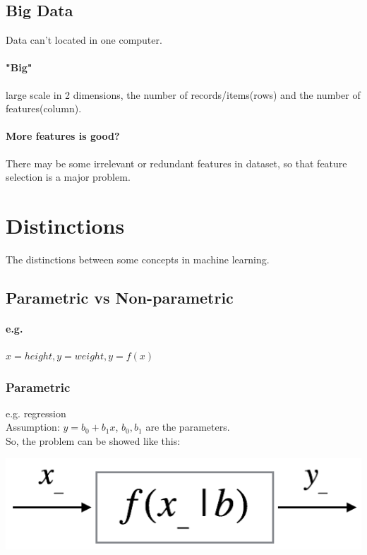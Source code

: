 \documentclass{article}
\begin{document}
{{    \subsection{Big Data}{
        Data can't located in one computer.
        \paragraph{"Big"}{
            large scale in 2 dimensions, the number of records/items(rows) and the number of features(column).
        }
        \paragraph{More features is good?}{
            There may be some irrelevant or redundant features in dataset, so that feature selection is a major problem.
        }
    }   
}
\section{Distinctions}{
    The distinctions between some concepts in machine learning.
    \subsection{Parametric vs Non-parametric}{
        \paragraph{e.g.}{
            \(x = height, y = weight, y = f(x)\)
        }
        \subsubsection{Parametric}{
            e.g. regression\\
            Assumption: $y = b_0 + b_1 x$, $b_0, b_1$ are the parameters.\\
            So, the problem can be showed like this:

            \begin{center}{
                \includegraphics[scale=0.5]{f(x_|b).png}
            }
            \end{center}

}}}}
\end{document}
